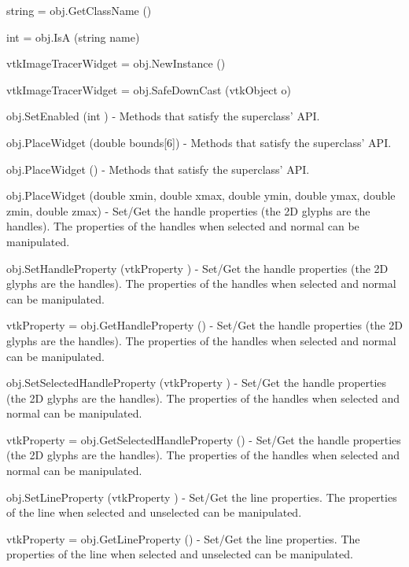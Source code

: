 \begin{DoxyItemize}
\item {\ttfamily string = obj.\-Get\-Class\-Name ()}  
\item {\ttfamily int = obj.\-Is\-A (string name)}  
\item {\ttfamily vtk\-Image\-Tracer\-Widget = obj.\-New\-Instance ()}  
\item {\ttfamily vtk\-Image\-Tracer\-Widget = obj.\-Safe\-Down\-Cast (vtk\-Object o)}  
\item {\ttfamily obj.\-Set\-Enabled (int )} -\/ Methods that satisfy the superclass' A\-P\-I.  
\item {\ttfamily obj.\-Place\-Widget (double bounds\mbox{[}6\mbox{]})} -\/ Methods that satisfy the superclass' A\-P\-I.  
\item {\ttfamily obj.\-Place\-Widget ()} -\/ Methods that satisfy the superclass' A\-P\-I.  
\item {\ttfamily obj.\-Place\-Widget (double xmin, double xmax, double ymin, double ymax, double zmin, double zmax)} -\/ Set/\-Get the handle properties (the 2\-D glyphs are the handles). The properties of the handles when selected and normal can be manipulated.  
\item {\ttfamily obj.\-Set\-Handle\-Property (vtk\-Property )} -\/ Set/\-Get the handle properties (the 2\-D glyphs are the handles). The properties of the handles when selected and normal can be manipulated.  
\item {\ttfamily vtk\-Property = obj.\-Get\-Handle\-Property ()} -\/ Set/\-Get the handle properties (the 2\-D glyphs are the handles). The properties of the handles when selected and normal can be manipulated.  
\item {\ttfamily obj.\-Set\-Selected\-Handle\-Property (vtk\-Property )} -\/ Set/\-Get the handle properties (the 2\-D glyphs are the handles). The properties of the handles when selected and normal can be manipulated.  
\item {\ttfamily vtk\-Property = obj.\-Get\-Selected\-Handle\-Property ()} -\/ Set/\-Get the handle properties (the 2\-D glyphs are the handles). The properties of the handles when selected and normal can be manipulated.  
\item {\ttfamily obj.\-Set\-Line\-Property (vtk\-Property )} -\/ Set/\-Get the line properties. The properties of the line when selected and unselected can be manipulated.  
\item {\ttfamily vtk\-Property = obj.\-Get\-Line\-Property ()} -\/ Set/\-Get the line properties. The properties of the line when selected and unselected can be manipulated.  

\end{DoxyItemize}
